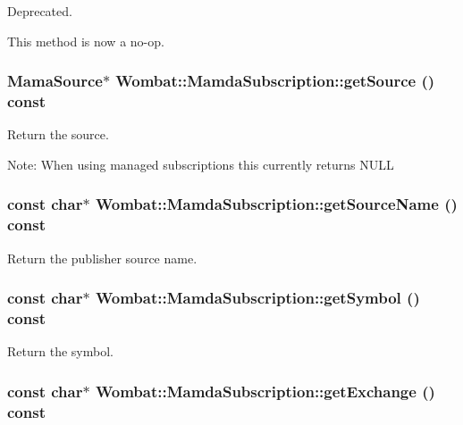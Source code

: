 Deprecated. 

This method is now a no-op. \hypertarget{classWombat_1_1MamdaSubscription_37067ac081e5a1dba009de761dc62f1a}{
\subsubsection[getSource]{\setlength{\rightskip}{0pt plus 5cm}Mama\-Source$\ast$ Wombat::Mamda\-Subscription::get\-Source () const}}
\label{classWombat_1_1MamdaSubscription_37067ac081e5a1dba009de761dc62f1a}


Return the source. 

Note: When using managed subscriptions this currently returns NULL \hypertarget{classWombat_1_1MamdaSubscription_37cfea863393d4f059c4b8c0dda71bfb}{
\subsubsection[getSourceName]{\setlength{\rightskip}{0pt plus 5cm}const char$\ast$ Wombat::Mamda\-Subscription::get\-Source\-Name () const}}
\label{classWombat_1_1MamdaSubscription_37cfea863393d4f059c4b8c0dda71bfb}


Return the publisher source name. 

\hypertarget{classWombat_1_1MamdaSubscription_e18c4e39125211c3a77acd421570177b}{
\subsubsection[getSymbol]{\setlength{\rightskip}{0pt plus 5cm}const char$\ast$ Wombat::Mamda\-Subscription::get\-Symbol () const}}
\label{classWombat_1_1MamdaSubscription_e18c4e39125211c3a77acd421570177b}


Return the symbol. 

\hypertarget{classWombat_1_1MamdaSubscription_41f68917cc5dca283dc667fdc2db11e6}{
\subsubsection[getExchange]{\setlength{\rightskip}{0pt plus 5cm}const char$\ast$ Wombat::Mamda\-Subscription::get\-Exchange () const}}
\label{classWombat_1_1MamdaSubscription_41f68917cc5dca283dc667fdc2db11e6}


